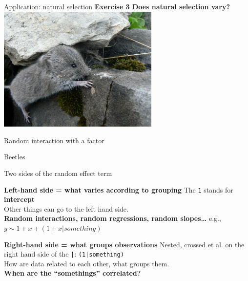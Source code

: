 \documentclass{beamer}
\begin{document}
\begin{frame}{Application: natural selection}
 \centering
    \textbf{Exercise 3 Does natural selection vary?}
 \includegraphics[width=0.6\textwidth]{figure/cutevole}
 
\end{frame}


\begin{frame}{Random interaction with a factor}
 
\end{frame}

\begin{frame}{Beetles}
 
\end{frame}

\begin{frame}{Two sides of the random effect term}

\begin{alertblock}{\textbf{Left-hand side = what varies according to grouping}}
The \texttt{1} stands for \textbf{intercept}\\
Other things can go to the left hand side. \\
\textbf{Random interactions, random regressions, random slopes\dots}
 e.g., $y \sim 1 + x + (1 + x | something)$
\end{alertblock}
 
 \pause 
 
\begin{alertblock}{\textbf{Right-hand side = what groups observations}}
Nested, crossed et al. on the right hand side of the \texttt{|}: \texttt{(1|something)}\\
How are data related to each other, what groups them.\\
\textbf{When are the ``somethings'' correlated?}
\end{alertblock}


\end{frame}
\end{document}
